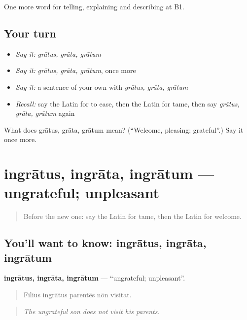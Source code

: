 \begin{grammarlens}[title={What you've built}]
One more word for telling, explaining and describing at B1.
\end{grammarlens}

\subsection*{Your turn}
\begin{itemize}
\raggedright
  \item \emph{Say it:} \emph{grātus, grāta, grātum}
  \item \emph{Say it:} \emph{grātus, grāta, grātum}, once more
  \item \emph{Say it:} a sentence of your own with \emph{grātus, grāta, grātum}
  \item \emph{Recall:} say the Latin for to ease, then the Latin for tame, then say \emph{grātus, grāta, grātum} again
\end{itemize}

\begin{tcolorbox}[breakable,colback=teal!4,colframe=teal!35!black,title={Before you move on}]
What does grātus, grāta, grātum mean? (\textquotedblleft{}Welcome, pleasing; grateful\textquotedblright{}.) Say it once more.
\end{tcolorbox}
\section[ingrātus, ingrāta, ingrātum]{ingrātus, ingrāta, ingrātum — ungrateful; unpleasant}

\label{lesson:LA-C512-ingratus}



\begin{quote}
Before the new one: say the Latin for tame, then the Latin for welcome.
\end{quote}

\subsection*{You'll want to know: ingrātus, ingrāta, ingrātum}
\textbf{ingrātus, ingrāta, ingrātum} — \textquotedblleft{}ungrateful; unpleasant\textquotedblright{}.

\begin{quote}
Fīlius ingrātus parentēs nōn vīsitat.
\end{quote}

\begin{quote}
\emph{The ungrateful son does not visit his parents.}
\end{quote}

